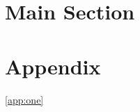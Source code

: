 \documentclass{article}
\begin{document}
\section{Main Section}
\section*{Appendix}\label{app:one}
\ref{app:one}
\end{document}

